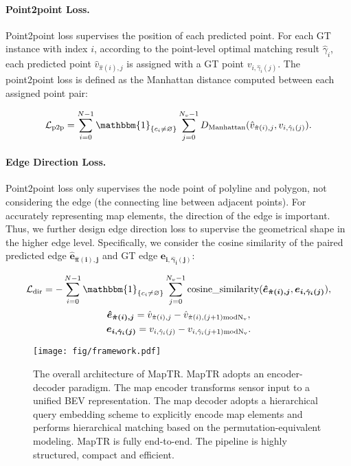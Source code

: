 \documentclass{article} \usepackage{iclr2023_conference,times}
\begin{document}
\paragraph{Point2point Loss.}
Point2point loss supervises the position of each predicted point.
For each GT instance with index $i$,
according to  the  point-level optimal matching result $\hat{\gamma}_i$,
each predicted point $\hat{v}_{\hat{\pi}(i),j}$ is assigned with a GT point $v_{i, \hat{\gamma}_i(j)}$. 
The point2point loss is defined  as the Manhattan distance computed between each assigned point pair:

\begin{equation}
\begin{gathered}
    \mathcal{L}_{\rm{p2p}} = \sum_{i=0}^{N-1}   \mathbbm{1}_{\{c_i\neq \varnothing\}}    \sum_{j=0}^{N_v-1} D_{\rm {Manhattan}}(\hat{v}_{\hat{\pi}(i),j},  v_{i, \hat{\gamma}_i(j)}).
\end{gathered}    
\end{equation}

\paragraph{Edge Direction Loss.}
Point2point loss only supervises the node point of polyline and polygon, not considering the edge (the connecting line between adjacent points).
For accurately representing map elements, the direction of the edge is
important.
Thus, we further design edge direction loss to
supervise the geometrical shape in the higher edge level.
Specifically, we consider the  cosine similarity of the paired predicted edge $\boldsymbol{\hat{e}_{\hat{\pi}(i),j}}$ and GT edge $\boldsymbol{e_{i, \hat{\gamma}_i(j)}}$:
  
\begin{equation}
\begin{gathered}
    \mathcal{L}_{\rm{dir}} = - \sum_{i=0}^{N-1}   \mathbbm{1}_{\{c_i\neq \varnothing\}}  
    \sum_{j=0}^{N_v-1}  {\rm cosine\_similarity}(\boldsymbol{\hat{e}_{\hat{\pi}(i),j}}, \boldsymbol{e_{i, \hat{\gamma}_i(j)}}),\\
    \boldsymbol{\hat{e}_{\hat{\pi}(i),j}}=\hat{v}_{\hat{\pi}(i),j}  - \hat{v}_{\hat{\pi}(i),(j+1) \rm{mod} N_v},\\
    \boldsymbol{e_{i, \hat{\gamma}_i(j)}}=v_{i, \hat{\gamma}_i(j)} - v_{i, \hat{\gamma}_i(j+1) \rm{mod} N_v}.
\end{gathered}    
\end{equation}


\begin{figure}[]
    \centering
    \texttt{[image: fig/framework.pdf]}
    \caption{The overall architecture of MapTR. MapTR adopts an encoder-decoder paradigm. The map encoder transforms sensor input to a unified BEV representation. The map decoder adopts a hierarchical query embedding scheme to explicitly encode  map elements and performs hierarchical matching based on the permutation-equivalent modeling. MapTR is fully end-to-end. The pipeline is highly structured, compact and efficient.}
    \label{fig:framework}
    \vspace*{-0.5cm}
\end{figure}
\end{document}

